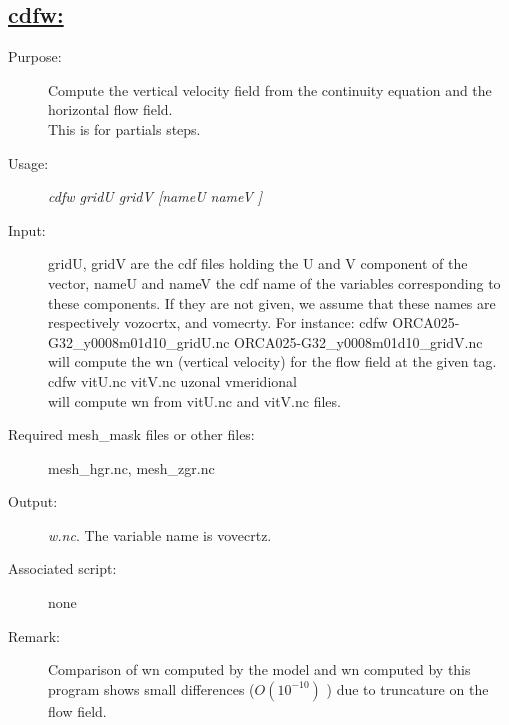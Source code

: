 \documentclass[a4paper,11pt]{article}
\begin{document}
\subsection*{\underline{cdfw:}}
\begin{description}
\item[Purpose:] Compute the vertical velocity field from the continuity equation and the horizontal flow field. \\
This is for partials steps.
\item[Usage:] {\em cdfw gridU gridV [nameU nameV ] }\\
\item[Input:] gridU, gridV are the cdf files holding the U and V component of the vector, nameU and nameV the cdf name
of the variables corresponding to these components. If they are not given, we assume that these names are respectively 
vozocrtx, and vomecrty.
For instance: cdfw   ORCA025-G32\_y0008m01d10\_gridU.nc ORCA025-G32\_y0008m01d10\_gridV.nc  \\
will compute  the wn (vertical velocity)  for the flow field at the given tag. \\
cdfw   vitU.nc vitV.nc  uzonal vmeridional \\
will compute  wn from vitU.nc and vitV.nc files.

\item[Required mesh\_mask files or other files:] mesh\_hgr.nc, mesh\_zgr.nc
\item[Output:] {\em w.nc}. The variable name is vovecrtz.
\item[Associated script:] none
\item[Remark:] Comparison of wn computed by the model and wn computed by this program shows small differences ($O(10^{-10})$ )
due to truncature on the flow field.
\end{description}

\newpage
\end{document}
